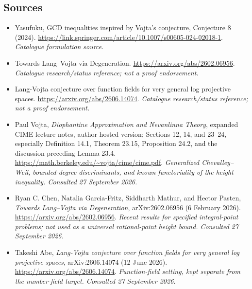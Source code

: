 \documentclass[11pt,a4paper]{article}
\numberwithin{equation}{section}
\begin{document}
\subsection{Sources}
\begin{itemize}\raggedright
\item[\textnormal{[S1]}]\hypertarget{source:64:1}{} Yasufuku, GCD inequalities inspired by Vojta's conjecture, Conjecture 8 (2024).
\url{https://link.springer.com/article/10.1007/s00605-024-02018-1}.
{\small\textit{Catalogue formulation source.}}
\item[\textnormal{[S2]}]\hypertarget{source:64:2}{} Towards Lang--Vojta via Degeneration.
\url{https://arxiv.org/abs/2602.06956}.
{\small\textit{Catalogue research/status reference; not a proof endorsement.}}
\item[\textnormal{[S3]}]\hypertarget{source:64:3}{} Lang-Vojta conjecture over function fields for very general log projective spaces.
\url{https://arxiv.org/abs/2606.14074}.
{\small\textit{Catalogue research/status reference; not a proof endorsement.}}

\item[\textnormal{[E1]}]\hypertarget{extra:64:1}{} Paul Vojta, \emph{Diophantine Approximation and Nevanlinna Theory}, expanded CIME lecture notes, author-hosted version; Sections 12, 14, and 23--24, especially Definition 14.1, Theorem 23.15, Proposition 24.2, and the discussion preceding Lemma 23.4.
\url{https://math.berkeley.edu/~vojta/cime/cime.pdf}.
{\small\textit{Generalized Chevalley--Weil, bounded-degree discriminants, and known functoriality of the height inequality. Consulted 27 September 2026.}}
\item[\textnormal{[E2]}]\hypertarget{extra:64:2}{} Ryan C. Chen, Natalia Garcia-Fritz, Siddharth Mathur, and Hector Pasten, \emph{Towards Lang--Vojta via Degeneration}, arXiv:2602.06956 (6 February 2026).
\url{https://arxiv.org/abs/2602.06956}.
{\small\textit{Recent results for specified integral-point problems; not used as a universal rational-point height bound. Consulted 27 September 2026.}}
\item[\textnormal{[E3]}]\hypertarget{extra:64:3}{} Takeshi Abe, \emph{Lang-Vojta conjecture over function fields for very general log projective spaces}, arXiv:2606.14074 (12 June 2026).
\url{https://arxiv.org/abs/2606.14074}.
{\small\textit{Function-field setting, kept separate from the number-field target. Consulted 27 September 2026.}}
\end{itemize}
\end{document}
